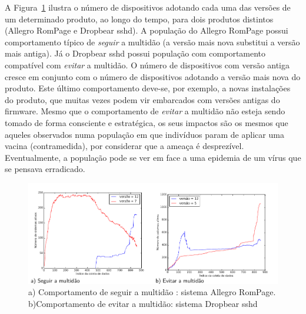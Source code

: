 	A Figura~\ref{fig:shodam_example}  ilustra o número de dispositivos adotando cada uma das versões de um determinado produto, ao longo do tempo, para dois produtos distintos (Allegro RomPage e Dropbear sshd). A população do   {Allegro RomPage} possui  comportamento típico de \emph{seguir} a multidão (a versão mais nova substitui a versão mais antiga).  Já o  Dropbear sshd possui  população com comportamento  compatível com \emph{evitar} a multidão. O número de dispositivos com versão antiga cresce em conjunto com o número de dispositivos adotando a versão mais nova do produto. Este último comportamento deve-se, por exemplo, a novas instalações do produto, que muitas vezes podem vir embarcados com versões antigas do firmware.  Mesmo que o comportamento de \emph{evitar} a multidão não esteja sendo tomado de forma consciente e estratégica, os seus impactos são os mesmos que aqueles observados numa população em que indivíduos param de aplicar uma vacina (contramedida), por considerar que a ameaça é desprezível.  Eventualmente,  a população pode  se ver em face a uma epidemia de um vírus que se pensava erradicado.  


	\begin{figure}[!htb]
	\hspace{-0.2in}	\includegraphics[width=1.0\columnwidth,keepaspectratio=false]{./img/shodam_example.pdf}
		\caption{a) Comportamento de seguir a multidão : sistema Allegro RomPage. b)Comportamento de evitar a multidão: sistema  Dropbear sshd}
		\label{fig:shodam_example}
	\end{figure}

		